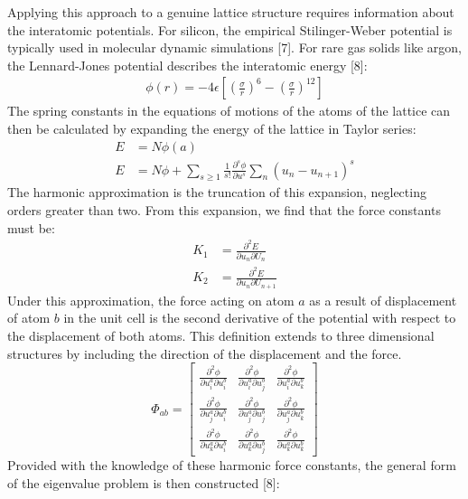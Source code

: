 Applying this approach to a genuine lattice structure requires information about the interatomic potentials. For silicon, the empirical Stilinger-Weber potential is typically used in molecular dynamic simulations [7]. For rare gas solids like argon, the Lennard-Jones potential describes the interatomic energy [8]:
\begin{align*}
	\phi(r)=-4\epsilon[(\frac{\sigma}{r})^6-(\frac{\sigma}{r})^{12}]	
\end{align*}
The spring constants in the equations of motions of the atoms of the lattice can then be calculated by expanding the energy of the lattice in Taylor series:
\begin{align*}
	E&=N\phi(a)\\
	E&=N\phi+\sum_{s\geq1}\frac{1}{s!}\frac{\partial^s\phi}{\partial u^s}\sum_n(u_n-u_{n+1})^s
\end{align*}
The harmonic approximation is the truncation of this expansion, neglecting orders greater than two. From this expansion, we find that the force constants must be:
\begin{align*}
	K_1&=\frac{\partial^2 E}{\partial u_n\partial U_{n}}\\
	K_2&=\frac{\partial^2 E}{\partial u_n\partial U_{n+1}}
\end{align*}
Under this approximation, the force acting on atom $a$ as a result of displacement of atom $b$ in the unit cell is the second derivative of the potential with respect to the displacement of both atoms. This definition extends to three dimensional structures by including the direction of the displacement and the force.
\[ 
\Phi_{ab}=
\begin{bmatrix}
  \frac{\partial^2 \phi}{\partial u^a_i\partial u^b_i} & \frac{\partial^2 \phi}{\partial u^a_i\partial u^b_j} &\frac{\partial^2 \phi}{\partial u^a_i\partial u^b_k}\\
  \frac{\partial^2 \phi}{\partial u^a_j\partial u^b_i} & \frac{\partial^2 \phi}{\partial u^a_j\partial u^b_j} &\frac{\partial^2 \phi}{\partial u^a_j\partial u^b_k}\\
\frac{\partial^2 \phi}{\partial u^a_k\partial u^b_i} & \frac{\partial^2 \phi}{\partial u^a_k\partial u^b_j} &\frac{\partial^2 \phi}{\partial u^a_k\partial u^b_k}
 \end{bmatrix}
\]
Provided with the knowledge of these harmonic force constants, the general form of the eigenvalue problem is then constructed [8]:
